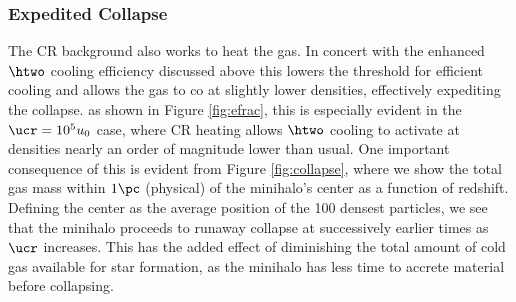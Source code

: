 \subsubsection{Expedited Collapse}
The CR background also works to heat the gas.  In concert with the enhanced $\htwo$ cooling efficiency discussed above this lowers the threshold for efficient cooling and allows the gas to co at slightly lower densities, effectively expediting the collapse.  as shown in Figure \ref{fig:efrac}, this is especially evident in the $\ucr = 10^5 u_0$ case, where CR heating allows $\htwo$ cooling to activate at densities nearly an order of magnitude lower than usual.  One important consequence of this is evident from Figure \ref{fig:collapse}, where we show the total gas mass within $1\pc$ (physical) of the minihalo's center as a function of redshift.  Defining the center as the average position of the 100 densest particles, we see that the minihalo proceeds to runaway collapse at successively earlier times as $\ucr$ increases.  This has the added effect of diminishing the total amount of cold gas available for star formation, as the minihalo has less time to accrete material before collapsing.